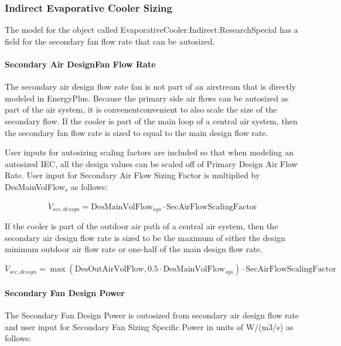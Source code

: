 \subsubsection{Indirect Evaporative Cooler Sizing}\label{indirect-evaporative-cooler-sizing-000}

The model for the object called EvaporativeCooler:Indirect:ResearchSpecial has a field for the secondary fan flow rate that can be autosized.

\paragraph{Secondary Air DesignFan Flow Rate}\label{secondary-air-designfan-flow-rate}

The secondary air design flow rate fan is not part of an airstream that is directly modeled in EnergyPlus. Because the primary side air flows can be autosized as part of the air system, it is convenentconvenient to also scale the size of the secondary flow. If the cooler is part of the main loop of a central air system, then the secondary fan flow rate is sized to equal to the main design flow rate.

User inputs for autosizing scaling factors are included so that when modeling an autosized IEC, all the design values can be scaled off of Primary Design Air Flow Rate. User input for Secondary Air Flow Sizing Factor is multiplied by DesMainVolFlow\(_{s}\) as follows:

\begin{equation}
\dot{V}_{sec,design} = \text{DesMainVolFlow}_{sys}\cdot\text{SecAirFlowScalingFactor}
\end{equation}

If the cooler is part of the outdoor air path of a central air system, then the secondary air design flow rate is sized to be the maximum of either the design minimum outdoor air flow rate or one-half of the main design flow rate.

\begin{equation}
\dot{V}_{sec,design} = \max\left(\text{DesOutAirVolFlow},0.5\cdot\text{DesMainVolFlow}_{sys}\right)\cdot\text{SecAirFlowScalingFactor}
\end{equation}

\paragraph{Secondary Fan Design Power}\label{secondary-fan-design-power}

The Secondary Fan Design Power is outosized from secondary air design flow rate and user input for Secondary Fan Sizing Specific Power in units of W/(m3/s) as follows:


